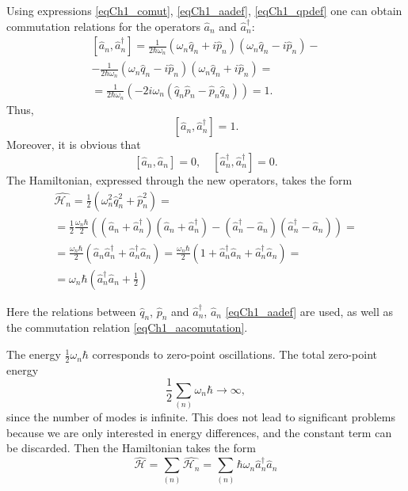 Using expressions \eqref{eqCh1_comut}, 
\eqref{eqCh1_aadef}, \eqref{eqCh1_qpdef} one can obtain commutation
relations for the operators $\hat{a}_n$ and $\hat{a}_n^{\dag}$:
\begin{eqnarray}
\left[\hat{a}_n, \hat{a}_n^{\dag}\right] = 
\frac{1}{2 \hbar \omega_n}
\left( \omega_n \hat{q}_n + i \hat{p}_n\right) 
\left( \omega_n \hat{q}_n - i \hat{p}_n\right) - 
\nonumber \\
- \frac{1}{2 \hbar \omega_n}
\left( \omega_n \hat{q}_n - i \hat{p}_n\right) 
\left( \omega_n \hat{q}_n + i \hat{p}_n\right) =
\nonumber \\
= \frac{1}{2 \hbar \omega_n}
\left( - 2 i \omega_n 
\left(\hat{q}_n \hat{p}_n - \hat{p}_n \hat{q}_n\right)\right) = 1.
\end{eqnarray}
Thus,
\begin{equation}
\left[\hat{a}_n, \hat{a}_n^{\dag}\right] = 1.
\label{eqCh1_aacomutation}
\end{equation}
Moreover, it is obvious that
\begin{equation}
\left[\hat{a}_n, \hat{a}_n\right] = 0,
\quad
\left[\hat{a}_n^{\dag}, \hat{a}_n^{\dag}\right] = 0.
\end{equation}
The Hamiltonian, expressed through the new operators, takes the form
\begin{eqnarray}
\hat{\mathcal{H}_n} = 
\frac{1}{2}\left(\omega_n^2 \hat{q}_n^2 + \hat{p}_n^2\right) = 
\nonumber \\
= \frac{1}{2}\frac{\omega_n \hbar}{2}
\left(
\left(\hat{a}_n + \hat{a}_n^{\dag} \right)
\left(\hat{a}_n + \hat{a}_n^{\dag} \right)
-
\left(\hat{a}_n^{\dag} - \hat{a}_n \right)
\left(\hat{a}_n^{\dag} - \hat{a}_n \right)
\right) =
\nonumber \\
= \frac{\omega_n \hbar}{2} 
\left( \hat{a}_n \hat{a}_n^{\dag} + \hat{a}_n^{\dag} \hat{a}_n\right) =
\frac{\omega_n \hbar}{2} 
\left(1 + \hat{a}_n^{\dag} \hat{a}_n + \hat{a}_n^{\dag} \hat{a}_n\right) =
\nonumber \\
= \omega_n \hbar 
\left(\hat{a}_n^{\dag} \hat{a}_n + \frac{1}{2}\right)
\label{eqCh1_quant_stoyachie_volny}
\end{eqnarray}

Here the relations between $\hat{q}_n$, $\hat{p}_n$ 
and $\hat{a}_n^{\dag}$, $\hat{a}_n$ \eqref{eqCh1_aadef} are used, as well as
the commutation relation \eqref{eqCh1_aacomutation}.

The energy $\frac{1}{2}\omega_n \hbar$ corresponds to zero-point
oscillations. The total zero-point energy
\[
\frac{1}{2}\sum_{(n)}\omega_n \hbar \to \infty,
\] 
since the number of modes is infinite. This does not lead to 
significant problems because we are only interested in energy differences,
and the constant term can be discarded. Then the Hamiltonian
takes the form
\begin{equation}
\hat{\mathcal{H}} = \sum_{(n)}\hat{\mathcal{H}_n} =
\sum_{(n)}\hbar \omega_n \hat{a}_n^{\dag}\hat{a}_n
\end{equation}

